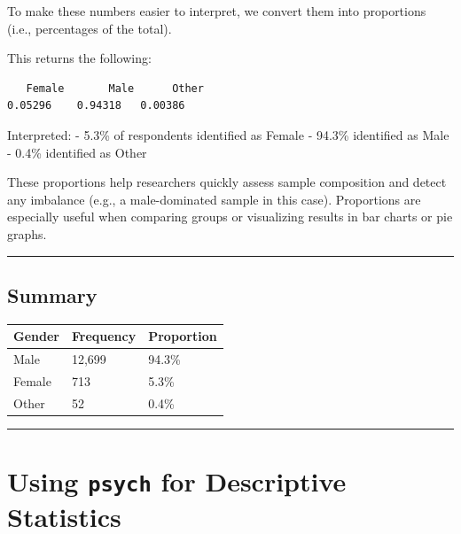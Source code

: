 \documentclass[
]{book}
\newenvironment{Shaded}{\begin{snugshade}}{\end{snugshade}}
\newcommand{\CommentTok}[1]{\textcolor[rgb]{0.56,0.35,0.01}{\textit{#1}}}
\newcommand{\FunctionTok}[1]{\textcolor[rgb]{0.13,0.29,0.53}{\textbf{#1}}}
\newcommand{\NormalTok}[1]{#1}
\newcommand{\SpecialCharTok}[1]{\textcolor[rgb]{0.81,0.36,0.00}{\textbf{#1}}}
\begin{document}
To make these numbers easier to interpret, we convert them into proportions (i.e., percentages of the total).

\begin{Shaded}
\end{Shaded}

This returns the following:

\begin{verbatim}
   Female       Male      Other 
0.05296    0.94318   0.00386
\end{verbatim}

Interpreted: - 5.3\% of respondents identified as Female - 94.3\% identified as Male - 0.4\% identified as Other

These proportions help researchers quickly assess sample composition and detect any imbalance (e.g., a male-dominated sample in this case). Proportions are especially useful when comparing groups or visualizing results in bar charts or pie graphs.

\begin{center}\rule{0.5\linewidth}{0.5pt}\end{center}

\subsection*{Summary}\label{summary-1}

\begin{longtable}[]{@{}lll@{}}
\toprule\noalign{}
Gender & Frequency & Proportion \\
\midrule\noalign{}
\endhead
\bottomrule\noalign{}
\endlastfoot
Male & 12,699 & 94.3\% \\
Female & 713 & 5.3\% \\
Other & 52 & 0.4\% \\
\end{longtable}

\begin{center}\rule{0.5\linewidth}{0.5pt}\end{center}

\section{\texorpdfstring{Using \texttt{psych} for Descriptive Statistics}{Using psych for Descriptive Statistics}}\label{using-psych-for-descriptive-statistics}
\end{document}
